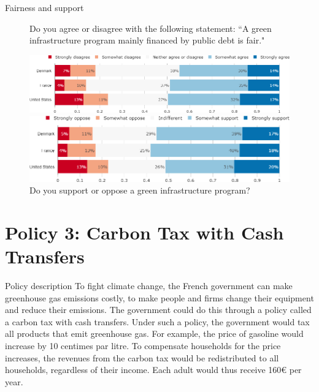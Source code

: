 \documentclass[aspectratio=169,9pt,dvipsnames]{beamer}
\begin{document}
\begin{frame}{Fairness and support}%
\begin{figure}[h!]
\centering
\caption{Do you agree or disagree with the following statement: ``A green infrastructure program mainly financed by public debt is fair."}
\includegraphics[width=.7\textwidth]{../figures/country_comparison/investments_fair_countries.png}
\vspace{.5cm}
\centering
\caption{Do you support or oppose a green infrastructure program?}
\includegraphics[width=.7\textwidth]{../figures/country_comparison/investments_support_countries.png}
\end{figure}


\end{frame}


\section{Policy 3: Carbon Tax with Cash Transfers}


\begin{frame}{Policy description}%
To fight climate change, the French government can make greenhouse gas emissions costly, to make people and firms change their equipment and reduce their emissions. The government could do this through a policy called a carbon tax with cash transfers. Under such a policy, the government would tax all products that emit greenhouse gas. For example, the price of gasoline would increase by 10 centimes par litre. To compensate households for the price increases, the revenues from the carbon tax would be redistributed to all households, regardless of their income. Each adult would thus receive 160\euro{} per year.
\end{frame}
\end{document}
